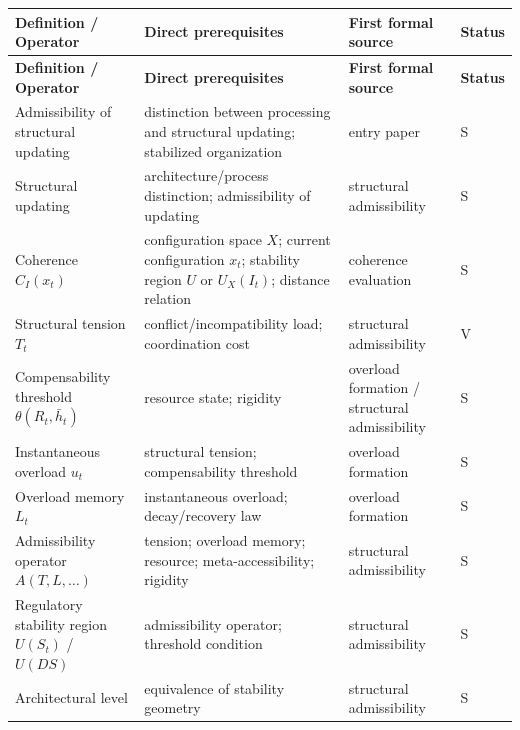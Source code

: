 \documentclass[11pt,a4paper]{article}
\begin{document}
	\begin{longtable}{>{\RaggedRight\arraybackslash}p{}
			>{\RaggedRight\arraybackslash}p{}
			>{\RaggedRight\arraybackslash}p{}
			>{\RaggedRight\arraybackslash}p{}}
		\toprule
		\textbf{Definition / Operator} & \textbf{Direct prerequisites} & \textbf{First formal source} & \textbf{Status} \\
		\midrule
		\endfirsthead
		\toprule
		\textbf{Definition / Operator} & \textbf{Direct prerequisites} & \textbf{First formal source} & \textbf{Status} \\
		\midrule
		\endhead
		
		Admissibility of structural updating & distinction between processing and structural updating; stabilized organization & entry paper & S \\
		
		Structural updating & architecture/process distinction; admissibility of updating & structural admissibility & S \\
		
		Coherence $C_I(x_t)$ & configuration space $X$; current configuration $x_t$; stability region $U$ or $U_X(I_t)$; distance relation & coherence evaluation & S \\
		
		Structural tension $T_t$ & conflict/incompatibility load; coordination cost & structural admissibility & V \\
		
		Compensability threshold $\theta(R_t,\bar h_t)$ & resource state; rigidity & overload formation / structural admissibility & S \\
		
		Instantaneous overload $u_t$ & structural tension; compensability threshold & overload formation & S \\
		
		Overload memory $L_t$ & instantaneous overload; decay/recovery law & overload formation & S \\
		
		Admissibility operator $A(T,L,\dots)$ & tension; overload memory; resource; meta-accessibility; rigidity & structural admissibility & S \\
		
		Regulatory stability region $U(S_t)$ / $U(DS)$ & admissibility operator; threshold condition & structural admissibility & S \\
		
		Architectural level & equivalence of stability geometry & structural admissibility & S \\
		

\end{longtable}
\end{document}
